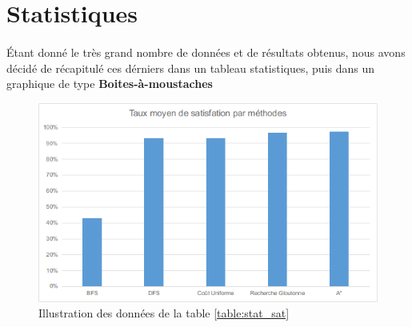 \section{Statistiques}
\paragraph{}
Étant donné le très grand nombre de données et de résultats obtenus, nous avons décidé de récapitulé ces dérniers dans un tableau statistiques, puis dans un graphique de type \textbf{Boites-à-moustaches}

\begin{table}[H]
	\centering
	\caption{Tableau de mesures statistiques pour les instances satifsiables}
	\label{table:stat_sat}
\end{table}
\begin{figure}[H]
	\includegraphics[width=\textwidth]{images/CompareUF75.png}
	\caption{Illustration des données de la table \ref{table:stat_sat}}
\end{figure}
